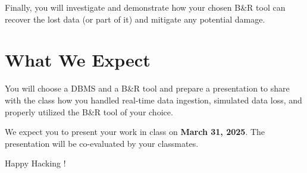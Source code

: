 \documentclass{article}
\begin{document}
Finally, you will investigate and demonstrate how your chosen B\&R tool can recover the lost data (or part of it) and mitigate any potential damage.

\section{What We Expect}
You will choose a DBMS and a B\&R tool and prepare a presentation to share with the class how you handled real-time data ingestion, simulated data loss, and properly utilized the B\&R tool of your choice.

We expect you to present your work in class on \textbf{March 31, 2025}. The presentation will be co-evaluated by your classmates.

\vspace{5mm}
Happy Hacking !
\end{document}
